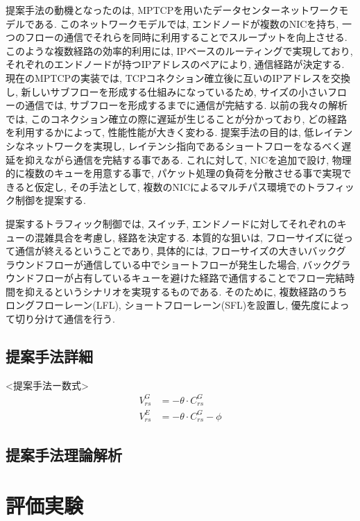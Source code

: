 \documentclass[11pt, a4paper, uplatex]{jsarticle}
\begin{document}
提案手法の動機となったのは, MPTCPを用いたデータセンターネットワークモデルである\cite{improving}.
このネットワークモデルでは, エンドノードが複数のNICを持ち, 一つのフローの通信でそれらを同時に利用することでスループットを向上させる.
このような複数経路の効率的利用には, IPベースのルーティングで実現しており, それぞれのエンドノードが持つIPアドレスのペアにより, 通信経路が決定する.
現在のMPTCPの実装では, TCPコネクション確立後に互いのIPアドレスを交換し,
新しいサブフローを形成する仕組みになっているため, サイズの小さいフローの通信では, サブフローを形成するまでに通信が完結する.
以前の我々の解析では, このコネクション確立の際に遅延が生じることが分かっており\cite{mptcp_ana}, どの経路を利用するかによって,
性能性能が大きく変わる.
提案手法の目的は, 低レイテンシなネットワークを実現し,
レイテンシ指向であるショートフローをなるべく遅延を抑えながら通信を完結する事である.
これに対して, NICを追加で設け, 物理的に複数のキューを用意する事で, パケット処理の負荷を分散させる事で実現できると仮定し, その手法として,
複数のNICによるマルチパス環境でのトラフィック制御を提案する.

提案するトラフィック制御では, スイッチ, エンドノードに対してそれぞれのキューの混雑具合を考慮し, 経路を決定する.
本質的な狙いは, フローサイズに従って通信が終えるということであり, 具体的には,
フローサイズの大きいバックグラウンドフローが通信している中でショートフローが発生した場合,
バックグラウンドフローが占有しているキューを避けた経路で通信することでフロー完結時間を抑えるというシナリオを実現するものである.
そのために, 複数経路のうちロングフローレーン(LFL), ショートフローレーン(SFL)を設置し, 優先度によって切り分けて通信を行う.

\subsection{提案手法詳細}
<提案手法ー数式>
\begin{eqnarray}
V_{rs}^G &= -\theta \cdot C_{rs}^G \nonumber \\
V_{rs}^E &= -\theta \cdot C_{rs}^G - \phi
\end{eqnarray}

\subsection{提案手法理論解析}


\section{評価実験}
\end{document}
